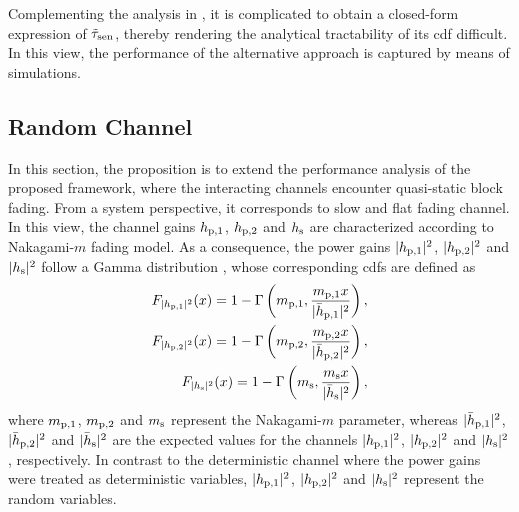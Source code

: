 \begin{remark} \label{rm:rem2} 
\normalfont
Complementing the analysis in \cite{Liang08}, it is complicated to obtain a closed-form expression of $\tilde{\tau}_{\text{sen}}$, thereby rendering the analytical tractability of its cdf difficult. In this view, the performance of the alternative approach is captured by means of simulations.
\end{remark} 

\subsection{Random Channel} \label{ssec_IS:ran_th}
In this section, the proposition is to extend the performance analysis of the proposed framework, where the interacting channels encounter quasi-static block fading. From a system perspective, it corresponds to slow and flat fading channel. In this view, the channel gains $h_{\text{p,1}}$, $h_{\text{p,2}}$ and $h_{\text{s}}$ are characterized according to Nakagami-$m$ fading model. As a consequence, the power gains $|h_{\text{p,1}}|^2$, $|h_{\text{p,2}}|^2$ and $|h_{\text{s}}|^2$ follow a Gamma distribution \cite{Goldsmith05}, whose corresponding cdfs are defined as
\begin{align}
F_{|h_{\text{p,1}}|^2}(x) = 1 - \Gamma\left(m_{\text{p,1}}, \frac{m_{\text{p,1}} x}{|\bar{h}_{\text{p,1}}|^2}\right), \label{eq_IS:dis_phpo}\\
F_{|h_{\text{p,2}}|^2}(x) = 1 - \Gamma\left(m_{\text{p,2}}, \frac{m_{\text{p,2}} x}{|\bar{h}_{\text{p,2}}|^2}\right), \label{eq_IS:dis_pght}\\  
F_{|h_{\text{s}}|^2}(x) = 1 - \Gamma\left(m_{\text{s}} , \frac{m_{\text{s}} x}{|\bar{h}_{\text{s}}|^2}\right), \label{eq_IS:dis_phs}
\end{align}
where $m_{\text{p,1}}$, $m_{\text{p,2}}$ and $m_{\text{s}}$ represent the Nakagami-$m$ parameter, whereas $|\bar{h}_{\text{p,1}}|^2$, $|\bar{h}_{\text{p,2}}|^2$ and $|\bar{h}_{\text{s}}|^2$ are the expected values for the channels $|h_{\text{p,1}}|^2$, $|h_{\text{p,2}}|^2$ and $|h_{\text{s}}|^2$, respectively. In contrast to the deterministic channel where the power gains were treated as deterministic variables, $|h_{\text{p,1}}|^2$, $|h_{\text{p,2}}|^2$ and $|h_{\text{s}}|^2$ represent the random variables. 

